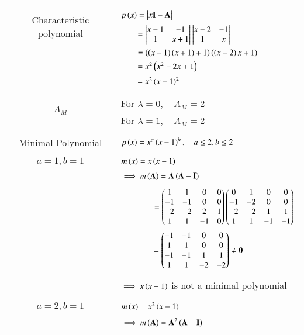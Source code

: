 \begin{longtable}{|c|l|}
    \hline
	\multirow{3}{*}{Characteristic polynomial} 
	& \\
	& $p\brak{x}=\mydet{x\Vec{I}-\Vec{A}}$\\
	& $\qquad = \begin{vmatrix}x-1&-1\\1&x+1\end{vmatrix}\begin{vmatrix}x-2&-1\\1&x\end{vmatrix}$\\
	& $\qquad=\left(\left(x-1\right)\left(x+1\right)+1\right)\left(\left(x-2\right)x+1\right)$\\
	&$\qquad=x^2\left(x^2-2x+1\right)$\\
	&$\qquad=x^2\left(x-1\right)^2$\\
	&\\
	\hline
	\multirow{3}{*}{$A_M$} 
	&\\
	& For $\lambda=0,\quad A_M=2$\\
	& For $\lambda=1,\quad A_M=2$\\
	&\\
	\hline
	\multirow{3}{*}{Minimal Polynomial} & \\
	& $p\left(x\right)=x^a\left(x-1\right)^b,\quad a\leq2, b\leq2$\\
	&\\
	\hline
	\multirow{3}{*}{$a=1,b=1$} & \\
	&$m\left(x\right)=x\left(x-1\right)$\\
	&\\
	& $\implies m\brak{\vec{A}}=\vec{A}\brak{\Vec{A}-\vec{I}}$\\
	&\\
	& $\qquad\qquad=\begin{pmatrix}1&1&0&0\\-1&-1&0&0\\-2&-2&2&1\\1&1&-1&0\end{pmatrix}\begin{pmatrix}0&1&0&0\\-1&-2&0&0\\-2&-2&1&1\\1&1&-1&-1\end{pmatrix}$\\
	& $\qquad \qquad = \myvec{-1&-1&0&0\\1&1&0&0\\-1&-1&1&1\\1&1&-2&-2}\neq\Vec{0}$\\
	&\\
	& $\implies x\left(x-1\right)$ is not a minimal polynomial\\
	&\\
	\hline
	\multirow{3}{*}{$a=2,b=1$} & \\
	&$m\left(x\right)=x^2\left(x-1\right)$\\
	&\\
	& $\implies m\brak{\vec{A}}=\vec{A}^2\brak{\Vec{A}-\vec{I}}$\\

\end{longtable}
